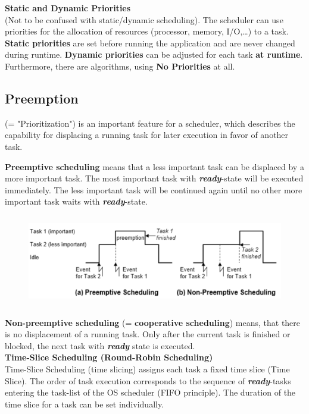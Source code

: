{\rot\bf Static and Dynamic Priorities}\\

(Not to be confused with static/dynamic scheduling). The scheduler can use priorities for the allocation of resources (processor, memory, I/O,{\dots}) to a task. \textbf{Static priorities} are set before running the application and are never changed during runtime. \textbf{Dynamic priorities} can be adjusted for each task \textbf{at runtime}. Furthermore, there are algorithms, using \textbf{No Priorities} at all. 

\subsection{Preemption}

(= "Prioritization") is an important feature for a scheduler, which describes the capability for displacing a running task for later execution in favor of another task. 

\textbf{Preemptive scheduling }means that a less important task can be displaced by a more important task. The most important task with \textbf{\textit{ready}}-state will be executed immediately. The less important task will be continued again until no other more important task waits with \textbf{\textit{ready}}-state.

	\begin{figure}[h]
    \centering
    \includegraphics[width=14cm, height=4cm]{Images/image89.png}
    \label{fig:Fig 34}
    \end{figure}

\textbf{Non-preemptive scheduling} (= \textbf{cooperative scheduling}) means, that there is no displacement of a running task. Only after the current task is finished or blocked, the next task with \textbf{\textit{ready}} state is executed.\\


{\rot\bf Time-Slice Scheduling (Round-Robin Scheduling)}\\

Time-Slice Scheduling (time slicing) assigns each task a fixed time slice (Time Slice). The order of task execution corresponds to the sequence of \textbf{\textit{ready}}-tasks entering the task-list of the OS scheduler (FIFO principle). The duration of the time slice for a task can be set individually.\\

